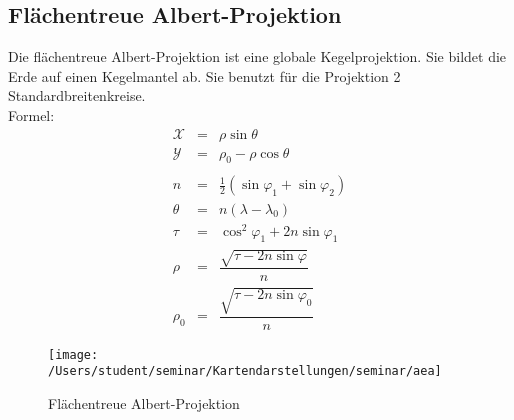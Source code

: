 \subsection{Flächentreue Albert-Projektion}
\label{sec:albert}
Die flächentreue Albert-Projektion ist eine globale Kegelprojektion. Sie bildet die Erde auf einen Kegelmantel ab. Sie benutzt für die Projektion 2 Standardbreitenkreise. 
\\

Formel:\\ 
\begin{eqnarray*}
\mathcal{X}&=&\rho \sin \theta \\
\mathcal{Y}&=&\rho _0 -\rho \cos \theta\\
\\
n&=&\frac{1}{2}(\sin \varphi _1 +\sin \varphi _2)\\
\theta &=&n(\lambda -\lambda _0)\\
\tau &=&\cos ^2 \varphi _1 +2n\sin \varphi _1\\
\rho &=&\dfrac{\sqrt{\tau -2n\sin \varphi}}{n}\\
\rho _0 &=&\dfrac{\sqrt{\tau -2n\sin \varphi _0}}{n}
\end{eqnarray*}

\begin{figure}[hbtp]
\centering
\texttt{[image: /Users/student/seminar/Kartendarstellungen/seminar/aea]} \\
\caption{Flächentreue Albert-Projektion}
\end{figure}
\newpage 
